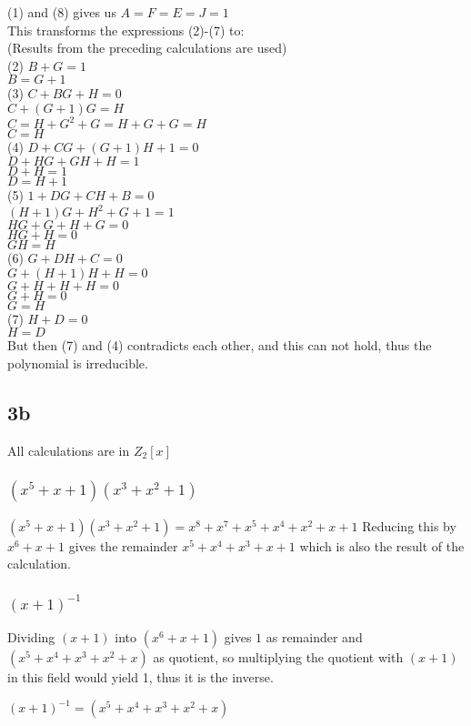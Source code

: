 \documentclass[a4paper,11pt]{article}
\begin{document}
				(1) and (8) gives us $A = F = E = J = 1$\\

				This transforms the expressions (2)-(7) to:\\
				(Results from the preceding calculations are used)\\

				(2)	$B + G = 1$\\
						$B = G + 1$\\
				(3)	$C + BG + H = 0$\\
						$C + (G+1)G = H $\\
						$C = H + G^2 + G = H + G+G = H$\\
						$C = H$\\
				(4)	$D + CG + (G+1)H + 1 = 0$\\
						$D + HG + GH+H = 1$\\
						$D + H = 1$\\
						$D = H + 1$\\
				(5)	$1 + DG + CH + B = 0$\\
						$(H + 1)G + H^2 + G + 1 = 1$\\
						$HG + G + H + G = 0$\\
						$HG + H = 0$\\
						$GH = H$\\
				(6)	$G + DH + C = 0$\\
						$G + (H+1)H + H = 0$\\
						$G + H + H + H = 0$\\
						$G + H = 0$\\
						$G = H$\\
				(7)	$H + D = 0$\\
						$H = D$\\

				But then (7) and (4) contradicts each other, and this can not hold, thus the
				polynomial is irreducible.

		\subsection*{3b}
			All calculations are in $Z_2[x]$\\
			\subsubsection*{$(x^5+x+1)(x^3+x^2+1)$}
				$(x^5+x+1)(x^3+x^2+1) = x^8 + x^7 + x^5 + x^4 + x^2 + x + 1$
				Reducing this by $x^6 + x + 1$ gives the remainder $x^5 + x^4 + x^3 + x + 1$ which is also the result of the calculation.

			\subsubsection*{$(x+1)^{-1}$ }
				Dividing $(x+1)$ into $(x^6 + x + 1)$ gives $1$ as remainder and $(x^5 + x^4 + x^3 +x^2 + x )$ as quotient, 
				so multiplying the quotient with $(x+1)$ in this field would yield 1, thus it is the inverse.

				$(x+1)^{-1} = (x^5 + x^4 + x^3 +x^2 + x)$

			
\end{document}
